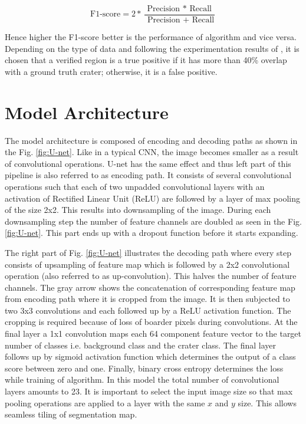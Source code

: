 \documentclass[11pt]{article}
\begin{document}
\begin{equation}
\text{F1-score} =2 * \frac{\text { Precision } * \text { Recall }}{\text { Precision }+\text { Recall}}
\label{f1}
\end{equation}

Hence higher the F1-score better is the performance of algorithm and vice versa. Depending on the type of data and following the experimentation results of \cite{emami2015automatic}, it is chosen that a verified region is a true positive if it has more than 40\% overlap with a ground truth crater; otherwise, it is a false positive.

\section{Model Architecture}
The model architecture is composed of encoding and decoding paths as shown in the Fig. \ref{fig:U-net}. Like in a typical CNN, the image becomes smaller as a result of convolutional operations. U-net has the same effect and thus left part of this pipeline is also referred to as encoding path. It consists of several convolutional operations such that each of two unpadded convolutional layers with an activation of Rectified Linear Unit (ReLU) are followed by a layer of max pooling of the size 2x2. This results into downsampling of the image. During each downsampling step the number of feature channels are doubled as seen in the Fig. \ref{fig:U-net}. This part ends up with a dropout function before it starts expanding.


The right part of Fig. \ref{fig:U-net} illustrates the decoding path where every step consists of upsampling of feature map which is followed by a 2x2 convolutional operation (also referred to as up-convolution). This halves the number of feature channels. The gray arrow shows the concatenation of corresponding feature map from encoding path where it is cropped from the image. It is then subjected to two 3x3 convolutions and each followed up by a ReLU activation function. The cropping is required because of loss of boarder pixels during convolutions. At the final layer a 1x1 convolution maps each 64 component feature vector to the target number of classes i.e. background class and the crater class. The final layer follows up by sigmoid activation function which determines the output of a class score between zero and one. Finally, binary cross entropy determines the loss while training of algorithm. In this model the total number of convolutional layers amounts to 23. It is important to select the input image size so that max pooling operations are applied to a layer with the same $x$ and $y$ size. This allows seamless tiling of segmentation map.
\end{document}
